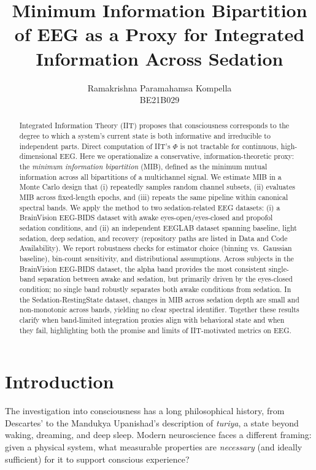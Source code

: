 \documentclass[11pt]{article}
\title{Minimum Information Bipartition of EEG as a Proxy for Integrated Information Across Sedation}
\author{Ramakrishna Paramahamsa Kompella \\ BE21B029}
\date{}
\begin{document}
\maketitle

\begin{abstract}
Integrated Information Theory (IIT) proposes that consciousness corresponds to the degree to which a system's current state is both informative and irreducible to independent parts. Direct computation of IIT's $\Phi$ is not tractable for continuous, high-dimensional EEG. Here we operationalize a conservative, information-theoretic proxy: the \emph{minimum information bipartition} (MIB), defined as the minimum mutual information across all bipartitions of a multichannel signal. We estimate MIB in a Monte Carlo design that (i) repeatedly samples random channel subsets, (ii) evaluates MIB across fixed-length epochs, and (iii) repeats the same pipeline within canonical spectral bands. We apply the method to two sedation-related EEG datasets: (i) a BrainVision EEG-BIDS dataset with awake eyes-open/eyes-closed and propofol sedation conditions, and (ii) an independent EEGLAB dataset spanning baseline, light sedation, deep sedation, and recovery (repository paths are listed in Data and Code Availability). We report robustness checks for estimator choice (binning vs.\ Gaussian baseline), bin-count sensitivity, and distributional assumptions. Across subjects in the BrainVision EEG-BIDS dataset, the alpha band provides the most consistent single-band separation between awake and sedation, but primarily driven by the eyes-closed condition; no single band robustly separates both awake conditions from sedation. In the Sedation-RestingState dataset, changes in MIB across sedation depth are small and non-monotonic across bands, yielding no clear spectral identifier. Together these results clarify when band-limited integration proxies align with behavioral state and when they fail, highlighting both the promise and limits of IIT-motivated metrics on EEG.
\end{abstract}

\section{Introduction}
The investigation into consciousness has a long philosophical history, from Descartes'  to the Mandukya Upanishad's description of \emph{turiya}, a state beyond waking, dreaming, and deep sleep. Modern neuroscience faces a different framing: given a physical system, what measurable properties are \emph{necessary} (and ideally sufficient) for it to support conscious experience?
\end{document}
